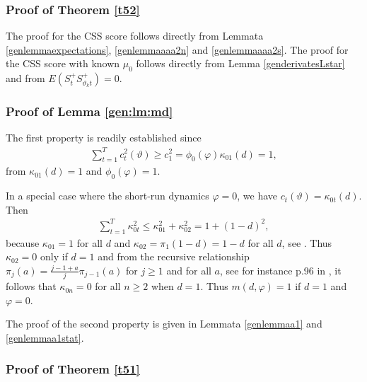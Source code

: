 {{\subsubsection{Proof of Theorem \ref{t52}} \label{proofthm52}


The proof for the CSS score follows directly from Lemmata \ref{genlemmaexpectations}, \ref{genlemmaaaa2n} and \ref{genlemmaaaa2s}. The proof for the CSS score with known $\mu_0$ follows directly from Lemma \ref{genderivatesLstar} and from $E( S_{t}^+ S_{\vartheta_k t}^+) = 0$. 





\subsubsection{Proof of Lemma \ref{gen:lm:md}} \label{lemma31}

The first property is readily established since 
\begin{align*}
    \sum_{t = 1}^T c^2_t(\vartheta) \geq c^2_1 = \phi_0(\varphi) \kappa_{01}(d) = 1,
\end{align*}
from $\kappa_{01}(d)  = 1$ and $\phi_0(\varphi) = 1$.

In a special case where the short-run dynamics $\varphi = 0$, we have $c_t(\vartheta) = \kappa_{0t}(d)$. Then
\begin{align*}
    \sum_{t = 1}^T  \kappa^2_{0t} \leq \kappa^2_{01} + \kappa^2_{02} = 1 + (1-d)^2,  
\end{align*}
because  $\kappa_{01} = 1$ for all $d$ and $\kappa_{02} = \pi_1(1-d) = 1-d$ for all $d$, see \textcite[Lemma A.4]{johansen2016role}. Thus $\kappa_{02} = 0$ only if $d = 1$ and from the recursive relationship $\pi_j(a) = \frac{j-1+a}{j} \pi_{j-1}(a)$ for $j \geq 1$ and for all $a$, see for instance p.96 in \textcite{hassler2019time}, it follows that $\kappa_{0n} = 0$ for all $n \geq 2$ when $d = 1$. Thus $m(d,\varphi) = 1$ if $d = 1$ and $\varphi = 0$.

The proof of the second property is given in Lemmata \ref{genlemmaa1} and \ref{genlemmaa1stat}.


\subsubsection{Proof of Theorem \ref{t51}} \label{proofthm51}

}}
